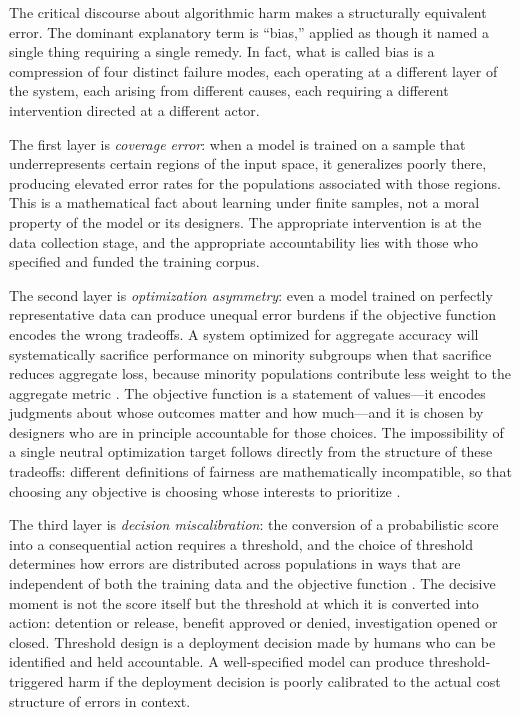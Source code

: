 \documentclass[12pt, a4paper]{article}
\begin{document}
The critical discourse about algorithmic harm makes a structurally equivalent error. The dominant explanatory term is \enquote{bias,} applied as though it named a single thing requiring a single remedy. In fact, what is called bias is a compression of four distinct failure modes, each operating at a different layer of the system, each arising from different causes, each requiring a different intervention directed at a different actor.

The first layer is \textit{coverage error}: when a model is trained on a sample that underrepresents certain regions of the input space, it generalizes poorly there, producing elevated error rates for the populations associated with those regions. This is a mathematical fact about learning under finite samples, not a moral property of the model or its designers. The appropriate intervention is at the data collection stage, and the appropriate accountability lies with those who specified and funded the training corpus.

The second layer is \textit{optimization asymmetry}: even a model trained on perfectly representative data can produce unequal error burdens if the objective function encodes the wrong tradeoffs. A system optimized for aggregate accuracy will systematically sacrifice performance on minority subgroups when that sacrifice reduces aggregate loss, because minority populations contribute less weight to the aggregate metric \citep{barocas2016}. The objective function is a statement of values---it encodes judgments about whose outcomes matter and how much---and it is chosen by designers who are in principle accountable for those choices. The impossibility of a single neutral optimization target follows directly from the structure of these tradeoffs: different definitions of fairness are mathematically incompatible, so that choosing any objective is choosing whose interests to prioritize \citep{friedler2021}.

The third layer is \textit{decision miscalibration}: the conversion of a probabilistic score into a consequential action requires a threshold, and the choice of threshold determines how errors are distributed across populations in ways that are independent of both the training data and the objective function \citep{corbett2018}. The decisive moment is not the score itself but the threshold at which it is converted into action: detention or release, benefit approved or denied, investigation opened or closed. Threshold design is a deployment decision made by humans who can be identified and held accountable. A well-specified model can produce threshold-triggered harm if the deployment decision is poorly calibrated to the actual cost structure of errors in context.
\end{document}
